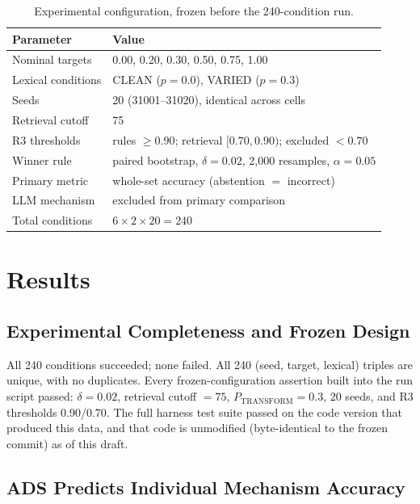 \documentclass[11pt]{article}
\begin{document}
\begin{table}[htbp]
\centering
\caption{Experimental configuration, frozen before the 240-condition run.}
\label{tab:config}
\begin{tabular}{ll}
\toprule
Parameter & Value \\
\midrule
Nominal targets & 0.00, 0.20, 0.30, 0.50, 0.75, 1.00 \\
Lexical conditions & CLEAN ($p{=}0.0$), VARIED ($p{=}0.3$) \\
Seeds & 20 (31001--31020), identical across cells \\
Retrieval cutoff & 75 \\
R3 thresholds & rules $\geq 0.90$; retrieval $[0.70,0.90)$; excluded $<0.70$ \\
Winner rule & paired bootstrap, $\delta{=}0.02$, 2{,}000 resamples, $\alpha{=}0.05$ \\
Primary metric & whole-set accuracy (abstention $=$ incorrect) \\
LLM mechanism & excluded from primary comparison \\
Total conditions & $6 \times 2 \times 20 = 240$ \\
\bottomrule
\end{tabular}
\end{table}

\section{Results}
\label{sec:results}

\subsection{Experimental Completeness and Frozen Design}
\label{sec:results-completeness}

All 240 conditions succeeded; none failed. All 240 (seed, target, lexical)
triples are unique, with no duplicates. Every frozen-configuration assertion
built into the run script passed: $\delta=0.02$, retrieval cutoff $=75$,
$P_{\mathrm{TRANSFORM}}=0.3$, 20 seeds, and R3 thresholds 0.90/0.70. The full
harness test suite passed on the code version that produced this data, and
that code is unmodified (byte-identical to the frozen commit) as of this
draft.

\subsection{ADS Predicts Individual Mechanism Accuracy}
\label{sec:results-accuracy}
\end{document}
